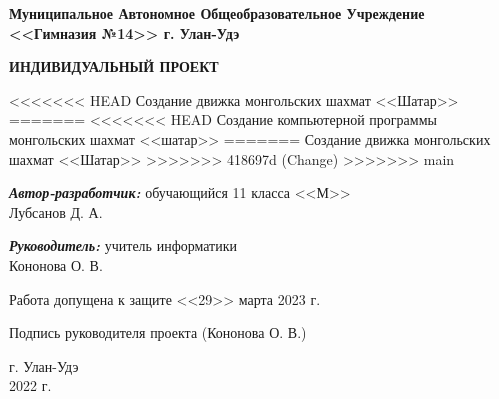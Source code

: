 \begin{titlepage}
	\begin{center}
		\textbf{ 
			Муниципальное Автономное Общеобразовательное Учреждение \\
			<<Гимназия №14>> г. Улан-Удэ
		}
		
		\vspace{4em}
		\textbf{
			ИНДИВИДУАЛЬНЫЙ ПРОЕКТ
		}
		\vspace{6em}
		
<<<<<<< HEAD
		Создание движка монгольских шахмат <<Шатар>>
=======
<<<<<<< HEAD
		Создание компьютерной программы монгольских шахмат <<шатар>>
=======
		Создание движка монгольских шахмат <<Шатар>>
>>>>>>> 418697d (Change)
>>>>>>> main
		
	\end{center}
	\vspace{8em}
	\begin{flushright}
		
		\textbf{\textit{Автор-разработчик:}}
		обучающийся 11 класса <<М>> \\
		Лубсанов Д. А.
		
		\vspace{2em}
		
		\textbf{\textit{Руководитель:}}
		учитель информатики \\
		Кононова О. В.
		
	\end{flushright}
	
	\vspace{6em}
	
	Работа допущена к защите <<29>> марта 2023 г.
	
	\vspace{1em}
	
	Подпись руководителя проекта \hrulefill (Кононова О. В.)
	
	\vspace{4em}
	
	\begin{center}
		г. Улан-Удэ \\
		2022 г.
	\end{center}
	
	\clearpage
\end{titlepage}
